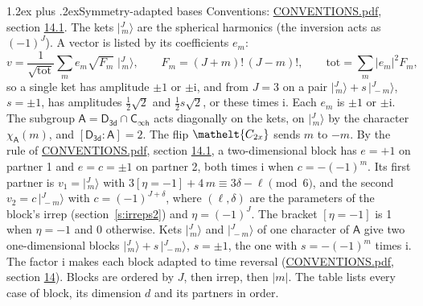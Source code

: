 \documentclass[10pt,a4paper]{article}
\makeatletter
\renewcommand\section{\@startsection{section}{1}{\z@}{-3ex plus -1ex minus -.2ex}%
  {1.2ex plus .2ex}{\normalfont\large\sffamily\bfseries\color{parttitle}}}
\numberwithin{equation}{section}
\newcommand{\eltfont}[1]{{\let\sigma\eltsigma\mathelt{#1}}}
\newcommand{\grp}[1]{\mathsf{#1}}
\newcommand{\elt}[1]{\eltfont{#1}}
\newcommand{\grpindex}[2]{[#1 : #2]}
\newcommand{\iverson}[1]{[#1]}
\newcommand{\iunit}{\mathrm{i}}
\newcommand{\chiA}{\chi_{\grp{A}}}
\newcommand{\jm}[2]{\bigl\lvert{}^{#1}_{\,#2}\bigr\rangle}
\makeatother
\begin{document}
\section{Symmetry-adapted bases}\label{s:bases}
Conventions: \href{../../CONVENTIONS.pdf}{CONVENTIONS.pdf}, section \href{../../CONVENTIONS.pdf\#conv.14.1}{14.1}.
\leavevmode\label{n:index.m}\label{n:vector.ket}The kets $\jm{J}{m}$ are the spherical harmonics (the inversion acts as $(-1)^J$). \label{n:index.ketcoefficient}\label{n:vector.basis.symmetry}\label{n:index.ketweight}\label{n:index.total}A vector is listed by its coefficients $e_m$:
\begin{equation}\label{e:ket}v = \frac{1}{\sqrt{\mathrm{tot}}}\sum_m e_m\sqrt{F_m}\;\jm{J}{m},\qquad F_m = (J+m)!\,(J-m)!,\qquad \mathrm{tot} = \sum_m |e_m|^2F_m,\end{equation}
\leavevmode\label{n:index.pair.sign}so a single ket has amplitude $\pm1$ or $\pm\iunit$, and from $J = 3$ on a pair $\jm{J}{m} + s\,\jm{J}{-m}$, $s = \pm1$, has amplitudes $\tfrac{1}{2}\sqrt{2}$ and $\tfrac{1}{2}s\sqrt{2}$, or these times $\iunit$. Each $e_m$ is $\pm1$ or $\pm\iunit$.
\leavevmode\label{n:group.A}\label{n:function.character.abelian}The subgroup $\grp{A} = \grp{D_{3d}}\cap\grp{C_{\infty h}}$ acts diagonally on the kets, on $\jm{J}{m}$ by the character $\chiA(m)$, and $\grpindex{\grp{D_{3d}}}{\grp{A}} = 2$. The flip $\elt{C_{2x}}$ sends $m$ to $-m$. \label{n:index.partner.sign}By the rule of \href{../../CONVENTIONS.pdf}{CONVENTIONS.pdf}, section \href{../../CONVENTIONS.pdf\#conv.14.1}{14.1}, a two-dimensional block has $e = +1$ on partner 1 and $e = c = \pm1$ on partner 2, both times $\iunit$ when $c = -(-1)^m$. \label{n:index.eta}Its first partner is $v_1 = \jm{J}{m}$ with $3\iverson{\eta = -1} + 4\,m \equiv 3\delta - \ell \pmod{6}$, and the second $v_2 = c\,\jm{J}{-m}$ with $c = (-1)^{J+\delta}$, where $(\ell, \delta)$ are the parameters of the block's irrep (section~\ref{s:irreps2}) and $\eta = (-1)^J$. The bracket $\iverson{\eta = -1}$ is 1 when $\eta = -1$ and 0 otherwise. Kets $\jm{J}{m}$ and $\jm{J}{-m}$ of one character of $\grp{A}$ give two one-dimensional blocks $\jm{J}{m} + s\,\jm{J}{-m}$, $s = \pm1$, the one with $s = -(-1)^m$ times $\iunit$. The factor $\iunit$ makes each block adapted to time reversal (\href{../../CONVENTIONS.pdf}{CONVENTIONS.pdf}, section \href{../../CONVENTIONS.pdf\#conv.14}{14}). Blocks are ordered by $J$, then irrep, then $|m|$.
\leavevmode\label{n:head.case}\label{n:head.partners}The table lists every case of block, its dimension $d$ and its partners in order.
\end{document}
